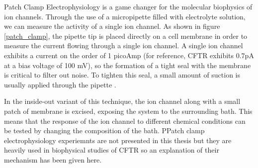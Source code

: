 Patch Clamp Electrophysiology is a game changer for the molecular biophysics of ion channels. Through the use of a micropipette filled with electrolyte solution, we can measure the activity of a single ion channel. As shown in figure \ref{patch_clamp}, the pipette tip is placed directly on a cell membrane in order to measure the current flowing through a single ion channel. A single ion channel exhibits a current on the order of 1 picoAmp (for reference, CFTR exhibits 0.7pA at a bias voltage of 100 mV), so the formation of a tight seal with the membrane is critical to filter out noise. To tighten this seal, a small amount of suction is usually applied through the pipette \cite{aidley1996}.

In the inside-out variant of this technique, the ion channel along with a small patch of membrane is excised, exposing the system to the surrounding bath. This means that the response of the ion channel to different chemical conditions can be tested by changing the composition of the bath. PPatch clamp electrophysiology experiemnts are not presented in this thesis but they are heavily used in biophysical studies of CFTR so an explanation of their mechanism has been given here.

